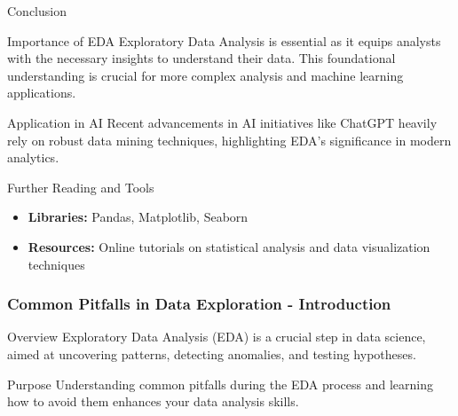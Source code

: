 \documentclass[aspectratio=169]{beamer}
\begin{document}
\begin{frame}{Conclusion}
    \begin{block}{Importance of EDA}
        Exploratory Data Analysis is essential as it equips analysts with the necessary insights to understand their data. This foundational understanding is crucial for more complex analysis and machine learning applications.
    \end{block}

    \begin{block}{Application in AI}
        Recent advancements in AI initiatives like ChatGPT heavily rely on robust data mining techniques, highlighting EDA's significance in modern analytics.
    \end{block}
\end{frame}

\begin{frame}{Further Reading and Tools}
    \begin{itemize}
        \item \textbf{Libraries:} Pandas, Matplotlib, Seaborn
        \item \textbf{Resources:} Online tutorials on statistical analysis and data visualization techniques
    \end{itemize}
\end{frame}

\begin{frame}
    \frametitle{Common Pitfalls in Data Exploration - Introduction}
    \begin{block}{Overview}
        Exploratory Data Analysis (EDA) is a crucial step in data science, aimed at uncovering patterns, detecting anomalies, and testing hypotheses.
    \end{block}
    \begin{block}{Purpose}
        Understanding common pitfalls during the EDA process and learning how to avoid them enhances your data analysis skills.
    \end{block}
\end{frame}
\end{document}
